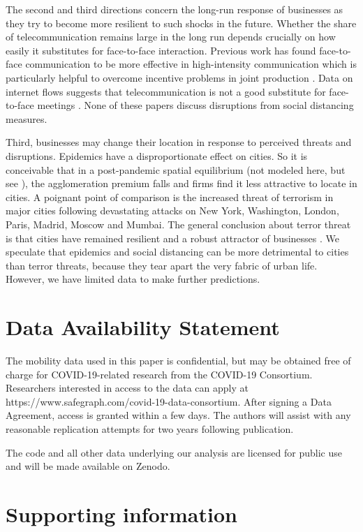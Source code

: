 The second and third directions concern the long-run response of businesses as they try to become more resilient to such shocks in the future. Whether the share of telecommunication remains large in the long run depends crucially on how easily it substitutes for face-to-face interaction. Previous work has found face-to-face communication to be more effective in high-intensity communication which is particularly helpful to overcome incentive problems in joint production \cite{Gaspar1998-gy,Storper2004-mg}. Data on internet flows suggests that telecommunication is not a good substitute for face-to-face meetings \cite{Cuberes2013-js}. None of these papers discuss disruptions from social distancing measures. 

Third, businesses may change their location in response to perceived threats and disruptions. Epidemics have a disproportionate effect on cities. So it is conceivable that in a post-pandemic spatial equilibrium (not modeled here, but see \cite{Tian2019-wq}), the agglomeration premium falls and firms find it less attractive to locate in cities. A poignant point of comparison is the increased threat of terrorism in major cities following devastating attacks on New York, Washington, London, Paris, Madrid, Moscow and Mumbai. The general conclusion about terror threat is that cities have remained resilient and a robust attractor of businesses \cite{Glaeser2002-mw,Harrigan2002-ik}. We speculate that epidemics and social distancing can be more detrimental to cities than terror threats, because they tear apart the very fabric of urban life. However, we have limited data to make further predictions.

\section*{Data Availability Statement}
The mobility data used in this paper \cite{SafeGraph2020-gn} is confidential, but may be obtained free of charge for COVID-19-related research from the COVID-19 Consortium. Researchers interested in access to the data can apply at https://www.safegraph.com/covid-19-data-consortium. After signing a Data Agreement, access is granted within a few days. The authors will assist with any reasonable replication attempts for two years following publication.

The code and all other data underlying our analysis are licensed for public use and will be made available on Zenodo. 

\section*{Supporting information}

